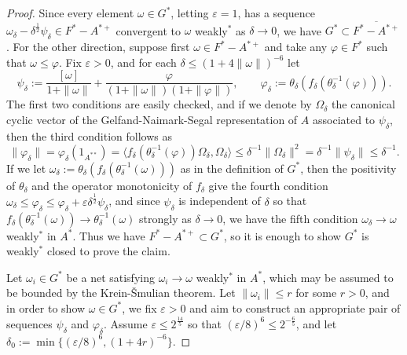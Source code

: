 \documentclass[noamsfonts,a4paper,10pt]{amsart}
\theoremstyle{plain}
\theoremstyle{definition}
\theoremstyle{remark}
\begin{document}
\begin{proof}
Since every element $\omega\in G^*$, letting $\varepsilon=1$, has a sequence $\omega_\delta-\delta^{\frac12}\psi_\delta\in F^*-A^{*+}$ convergent to $\omega$ weakly$^*$ as $\delta\to0$, we have $G^*\subset\overline{F^*-A^{*+}}$.
For the other direction, suppose first $\omega\in F^*-A^{*+}$ and take any $\varphi\in F^*$ such that $\omega\le\varphi$.
Fix $\varepsilon>0$, and for each $\delta\le(1+4\|\omega\|)^{-6}$ let
\[\psi_\delta:=\frac{[\omega]}{1+\|\omega\|}+\frac\varphi{(1+\|\omega\|)(1+\|\varphi\|)},\qquad\varphi_\delta:=\theta_\delta(f_\delta(\theta_\delta^{-1}(\varphi))).\]
The first two conditions are easily checked, and if we denote by $\Omega_\delta$ the canonical cyclic vector of the Gelfand-Naimark-Segal representation of $A$ associated to $\psi_\delta$, then the third condition follows as
\[\|\varphi_\delta\|=\varphi_\delta(1_{A^{**}})=\langle f_\delta(\theta_\delta^{-1}(\varphi))\Omega_\delta,\Omega_\delta\rangle\le\delta^{-1}\|\Omega_\delta\|^2=\delta^{-1}\|\psi_\delta\|\le\delta^{-1}.\]
If we let $\omega_\delta:=\theta_\delta(f_\delta(\theta_\delta^{-1}(\omega)))$ as in the definition of $G^*$, then the positivity of $\theta_\delta$ and the operator monotonicity of $f_\delta$ give the fourth condition $\omega_\delta\le\varphi_\delta\le\varphi_\delta+\varepsilon\delta^{\frac12}\psi_\delta$, and since $\psi_\delta$ is independent of $\delta$ so that $f_\delta(\theta_\delta^{-1}(\omega))\to\theta_\delta^{-1}(\omega)$ strongly as $\delta\to0$, we have the fifth condition $\omega_\delta\to\omega$ weakly$^*$ in $A^*$.
Thus we have $F^*-A^{*+}\subset G^*$, so it is enough to show $G^*$ is weakly$^*$ closed to prove the claim.

Let $\omega_i\in G^*$ be a net satisfying $\omega_i\to\omega$ weakly$^*$ in $A^*$, which may be assumed to be bounded by the Krein-\v Smulian theorem.
Let $\|\omega_i\|\le r$ for some $r>0$, and in order to show $\omega\in G^*$, we fix $\varepsilon>0$ and aim to construct an appropriate pair of sequences $\psi_\delta$ and $\varphi_\delta$.
Assume $\varepsilon\le2^{\frac{14}5}$ so that $(\varepsilon/8)^6\le2^{-\frac65}$, and let $\delta_0:=\min\{(\varepsilon/8)^6,(1+4r)^{-6}\}$.



\end{proof}
\end{document}
